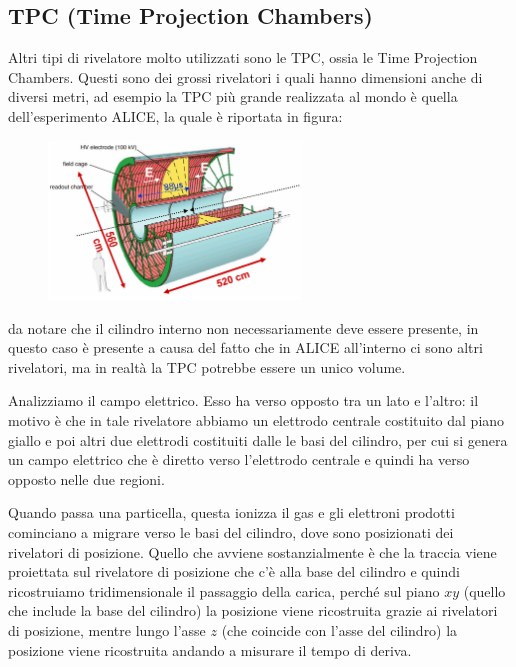 \subsection{TPC (Time Projection Chambers)}

Altri tipi di rivelatore molto utilizzati sono le TPC, ossia le Time Projection Chambers. Questi sono dei grossi rivelatori i quali hanno dimensioni anche di diversi metri, ad esempio la TPC più grande realizzata al mondo è quella dell'esperimento ALICE, la quale è riportata in figura:
\begin{figure}[H]
   \centering
   \includegraphics[width=0.6\textwidth]{immagini/TPC_1.png}
\end{figure}
\E da notare che il cilindro interno non necessariamente deve essere presente, in questo caso è presente a causa del fatto che in ALICE all'interno ci sono altri rivelatori, ma in realtà la TPC potrebbe essere un unico volume.

Analizziamo il campo elettrico. Esso ha verso opposto tra un lato e l'altro: il motivo è che in tale rivelatore abbiamo un elettrodo centrale costituito dal piano giallo e poi altri due elettrodi costituiti dalle le basi del cilindro, per cui si genera un campo elettrico che è diretto verso l'elettrodo centrale e quindi ha verso opposto nelle due regioni. 

Quando passa una particella, questa ionizza il gas e gli elettroni prodotti cominciano a migrare verso le basi del cilindro, dove sono posizionati dei rivelatori di posizione. Quello che avviene sostanzialmente è che la traccia viene proiettata sul rivelatore di posizione che c'è alla base del cilindro e quindi ricostruiamo tridimensionale il passaggio della carica, perché sul piano $xy$ (quello che include la base del cilindro) la posizione viene ricostruita grazie ai rivelatori di posizione, mentre lungo l'asse $z$ (che coincide con l'asse del cilindro) la posizione viene ricostruita andando a misurare il tempo di deriva.

